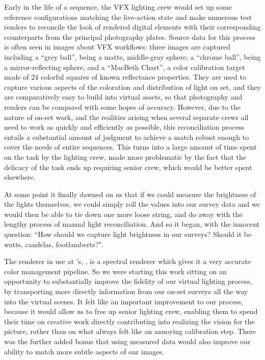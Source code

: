 Early in the life of a sequence, the \gls{VFX} lighting crew would set up some reference configurations
matching the live-action state and make numerous test renders to reconcile the look of rendered
digital elements with their corresponding counterparts from the principal photography plates. 
Source data for this process is often seen in images about \gls{VFX} workflows: three images are captured including
a ``grey ball'', being a matte, middle-gray sphere, a ``chrome ball'', being a mirror-reflecting
sphere, and a ``MacBeth Chart'', a color calibration target made of 24 colorful squares of known 
reflectance properties.
They are used to capture various aspects of the coloration and distribution of light on set,
and they are comparatively easy to build into \gls{virtual} assets, so that photography and renders 
can be compared with some hopes of accuracy.
However, due to the nature of on-set work, and the realities arising when several separate crews 
all need to work as quickly and efficiently as possible, 
this reconciliation process entails a substantial amount of 
judgment to achieve a match robust enough to cover the needs of entire sequences. 
This turns into a large amount of time spent on the task by the lighting crew, 
made more problematic by the fact that the delicacy of the task ends up requiring
senior crew, which would be better spent elsewhere.

At some point it finally dawned on us that if we could measure the brightness
of the lights themselves, we could simply roll the values into our survey data 
and we would then be able to tie down one more loose string, 
and do away with the lengthy process of manual light reconciliation. 
And so it began, with the innocent question: ``How should we capture light 
brightness in our surveys? Should it be watts, candelas, footlamberts?".


The renderer in use at 's, , is a spectral renderer
which gives it a very accurate color management pipeline. 
So we were starting this work sitting on an opportunity to substantially improve the fidelity of 
our \gls{virtual} lighting process, by transporting more directly information from our on-set 
surveys all the way into the \gls{virtual} scenes.
It felt like an important improvement to our process, because it would allow us to free up 
senior lighting crew, enabling them to spend their time on creative work directly contributing into
realizing the vision for the picture, rather than on what always felt like an annoying calibration step.
There was the further added bonus that using measured data would also improve our ability to match 
more subtle aspects of our images.

